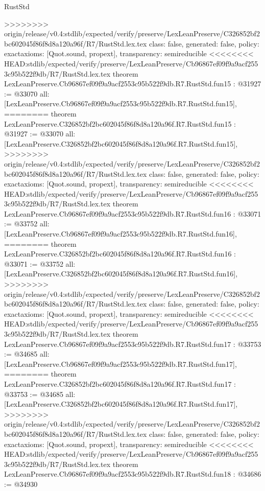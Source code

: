\begin{lexlean}{RustStd}
\begin{coremodule}
{\begin{coremodule}
{{{{{{{{{{{{{{{{{{>>>>>>>> origin/release/v0.4:stdlib/expected/verify/preserve/LexLeanPreserve/C326852bf2bc602045f86f8d8a120a96f/R7/RustStd.lex.tex
  class: false,
  generated: false,
  policy: exact{axioms: [Quot.sound, propext]},
  transparency: semireducible
}
<<<<<<<< HEAD:stdlib/expected/verify/preserve/LexLeanPreserve/Cb96867ef09f9a9acf2553c95b522f9db/R7/RustStd.lex.tex
theorem LexLeanPreserve.Cb96867ef09f9a9acf2553c95b522f9db.R7.RustStd.fun15 : @31927 := @33070 {
  all: [LexLeanPreserve.Cb96867ef09f9a9acf2553c95b522f9db.R7.RustStd.fun15],
========
theorem LexLeanPreserve.C326852bf2bc602045f86f8d8a120a96f.R7.RustStd.fun15 : @31927 := @33070 {
  all: [LexLeanPreserve.C326852bf2bc602045f86f8d8a120a96f.R7.RustStd.fun15],
>>>>>>>> origin/release/v0.4:stdlib/expected/verify/preserve/LexLeanPreserve/C326852bf2bc602045f86f8d8a120a96f/R7/RustStd.lex.tex
  class: false,
  generated: false,
  policy: exact{axioms: [Quot.sound, propext]},
  transparency: semireducible
}
<<<<<<<< HEAD:stdlib/expected/verify/preserve/LexLeanPreserve/Cb96867ef09f9a9acf2553c95b522f9db/R7/RustStd.lex.tex
theorem LexLeanPreserve.Cb96867ef09f9a9acf2553c95b522f9db.R7.RustStd.fun16 : @33071 := @33752 {
  all: [LexLeanPreserve.Cb96867ef09f9a9acf2553c95b522f9db.R7.RustStd.fun16],
========
theorem LexLeanPreserve.C326852bf2bc602045f86f8d8a120a96f.R7.RustStd.fun16 : @33071 := @33752 {
  all: [LexLeanPreserve.C326852bf2bc602045f86f8d8a120a96f.R7.RustStd.fun16],
>>>>>>>> origin/release/v0.4:stdlib/expected/verify/preserve/LexLeanPreserve/C326852bf2bc602045f86f8d8a120a96f/R7/RustStd.lex.tex
  class: false,
  generated: false,
  policy: exact{axioms: [Quot.sound, propext]},
  transparency: semireducible
}
<<<<<<<< HEAD:stdlib/expected/verify/preserve/LexLeanPreserve/Cb96867ef09f9a9acf2553c95b522f9db/R7/RustStd.lex.tex
theorem LexLeanPreserve.Cb96867ef09f9a9acf2553c95b522f9db.R7.RustStd.fun17 : @33753 := @34685 {
  all: [LexLeanPreserve.Cb96867ef09f9a9acf2553c95b522f9db.R7.RustStd.fun17],
========
theorem LexLeanPreserve.C326852bf2bc602045f86f8d8a120a96f.R7.RustStd.fun17 : @33753 := @34685 {
  all: [LexLeanPreserve.C326852bf2bc602045f86f8d8a120a96f.R7.RustStd.fun17],
>>>>>>>> origin/release/v0.4:stdlib/expected/verify/preserve/LexLeanPreserve/C326852bf2bc602045f86f8d8a120a96f/R7/RustStd.lex.tex
  class: false,
  generated: false,
  policy: exact{axioms: [Quot.sound, propext]},
  transparency: semireducible
}
<<<<<<<< HEAD:stdlib/expected/verify/preserve/LexLeanPreserve/Cb96867ef09f9a9acf2553c95b522f9db/R7/RustStd.lex.tex
theorem LexLeanPreserve.Cb96867ef09f9a9acf2553c95b522f9db.R7.RustStd.fun18 : @34686 := @34930 {
}}}}}}}}}}}}}}}}}}}}}
\end{coremodule}}
\end{coremodule}
\end{lexlean}
